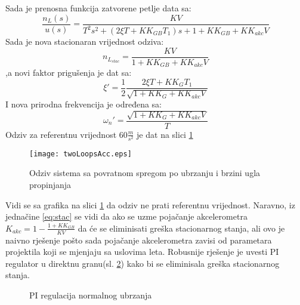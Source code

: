 Sada je prenosna funkcija zatvorene petlje data sa:
\begin{equation}
    \frac{n_L(s)}{u(s)} = \frac{KV}{T^2s^2 + (2\xi T+KK_{GB}T_1)s + 1+KK_{GB}+KK_{akc}V}
\end{equation}
Sada je nova stacionaran vrijednost odziva:
\begin{equation*}
    n_{L_{stac}} = \frac{KV}{ 1+KK_{GB}+KK_{akc}V}
    \label{eq:stac}
\end{equation*}
,a novi faktor prigušenja je dat sa:
\begin{equation*}
    \xi ' = \frac{1}{2}\frac{2\xi T+KK_GT_1}{\sqrt{1+KK_G+KK_{akc}V}}
\end{equation*}
I nova prirodna frekvencija je određena sa:
\begin{equation*}
    \omega _n' =\frac{\sqrt{1+KK_G+KK_{akc}V}}{T} 
\end{equation*}
Odziv za referentnu vrijednost $60 \frac{m}{s^2}$ je dat na slici \ref{fig:acc2loopsres}
\begin{figure}[!ht]
    \centering
    \texttt{[image: twoLoopsAcc.eps]}
    \caption{Odziv sistema sa povratnom spregom po ubrzanju i brzini ugla propinjanja}
    \label{fig:acc2loopsres}
\end{figure}
Vidi se sa grafika na slici \ref{fig:acc2loopsres} da odziv ne prati referentnu vrijednost. 
Naravno, iz jednačine \ref{eq:stac} se vidi da ako se uzme pojačanje akcelerometra $K_{akc} =1- \frac{1+KK_{GB}}{KV}$
da će se eliminisati greška stacionarnog stanja, ali ovo je naivno rješenje pošto sada pojačanje 
akcelerometra zavisi od parametara projektila koji se mjenjaju sa uslovima leta. Robusnije rješenje je 
uvesti PI regulator u direktnu granu(sl. \ref{fig:pir}) kako bi se eliminisala greška stacionarnog stanja. 
\begin{figure}[!ht]
    \centering
\caption{PI regulacija normalnog ubrzanja}
\label{fig:pir}
\end{figure}
